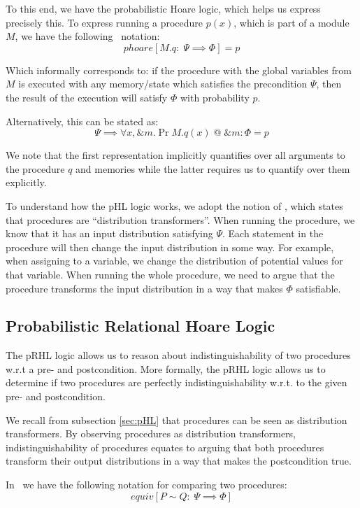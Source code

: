 To this end, we have the probabilistic Hoare logic, which helps us express precisely this.
To express running a procedure $p(x)$, which is part of a module $M$, we have the
following \easycrypt\ notation:
\[
  phoare[M.q :\; \Psi \implies \Phi] = p
\]

Which informally corresponds to: if the procedure with the global variables from $M$
is executed with any memory/state which satisfies the precondition $\Psi$, then the
result of the execution will satisfy $\Phi$ with probability $p$.

Alternatively, this can be stated as:
\begin{equation}
  \label{eq:proc_pr}
  \Psi \implies \forall x, \&m.\Pr{M.q(x) \; @ \; \&m : \Phi} = p
\end{equation}

We note that the first representation implicitly quantifies over all
arguments to the procedure $q$ and memories while the latter requires us to quantify over them explicitly.

To understand how the pHL logic works, we adopt the notion of \cite{ec_intro},
which states that procedures are ``distribution transformers''.
When running the procedure, we know that it has an input distribution satisfying
$\Psi$. Each statement in the procedure will then change the input distribution
in some way. For example, when assigning to a variable, we change the
distribution of potential values for that variable. When running the whole
procedure, we need to argue that the procedure transforms the input distribution
in a way that makes $\Phi$ satisfiable.

\subsection{Probabilistic Relational Hoare Logic}
\label{sec:pRHL}
The pRHL logic allows us to reason about indistinguishability of two
procedures w.r.t a pre- and postcondition. More formally, the pRHL logic
allows us to determine if two procedures are perfectly indistinguishability w.r.t.
to the given pre- and postcondition.

We recall from subsection \ref{sec:pHL} that procedures can be seen as distribution
transformers. By observing procedures as distribution transformers,
indistinguishability of procedures equates to arguing that both procedures
transform their output distributions in a way that makes the postcondition
true.

In \easycrypt\ we have the following notation for comparing two procedures:
\[
  equiv[P \sim Q :\; \Psi \implies \Phi ]
\]

